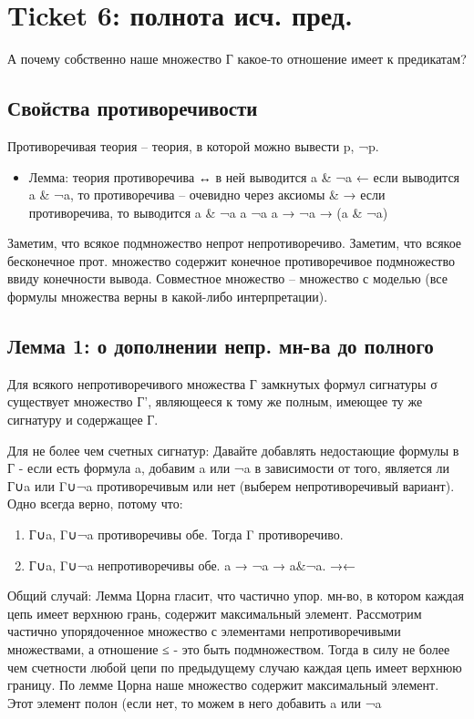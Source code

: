 \documentclass[11pt]{article}
\begin{document}
\section{Ticket 6: полнота исч. пред.}
\label{sec-8}
А почему собственно наше множество Г какое-то отношение
имеет к предикатам?
\subsection{Свойства противоречивости}
\label{sec-8-1}
Противоречивая теория – теория, в которой можно
вывести p, ¬p.
\begin{itemize}
\item Лемма: теория противоречива ↔ в ней выводится a \& ¬a
← если выводится a \& ¬a, то противоречива – очевидно
через аксиомы \&
→ если противоречива, то выводится a \& ¬a
a
¬a
a → ¬a → (a \& ¬a)
\end{itemize}
Заметим, что всякое подмножество непрот непротиворечиво.
Заметим, что всякое бесконечное прот. множество содержит
конечное противоречивое подмножество ввиду конечности
вывода.
Совместное множество – множество с моделью (все формулы
множества верны в какой-либо интерпретации).
\subsection{Лемма 1: о дополнении непр. мн-ва до полного}
\label{sec-8-2}
Для всякого непротиворечивого множества Г
замкнутых формул сигнатуры σ существует множество Г',
являющееся к тому же полным, имеющее ту же сигнатуру
и содержащее Г.

Для не более чем счетных сигнатур:
Давайте добавлять недостающие формулы в Г - если есть
формула a, добавим a или ¬a в зависимости от того,
является ли Г∪a или Γ∪¬a противоречивым или нет (выберем
непротиворечивый вариант). Одно всегда верно, потому
что:
\begin{enumerate}
\item Г∪a, Γ∪¬a противоречивы обе. Тогда Γ противоречиво.
\item Г∪a, Γ∪¬a непротиворечивы обе. a → ¬a → a\&¬a. →←
\end{enumerate}

Общий случай:
Лемма Цорна гласит, что частично упор. мн-во, в котором
каждая цепь имеет верхнюю грань, содержит максимальный
элемент.
Рассмотрим частично упорядоченное множество с элементами
непротиворечивыми множествами, а отношение ≤ - это
быть подмножеством. Тогда в силу не более чем счетности
любой цепи по предыдущему случаю каждая цепь имеет
верхнюю границу. По лемме Цорна наше множество содержит
максимальный элемент. Этот элемент полон (если нет,
то можем в него добавить a или ¬a
\end{document}
